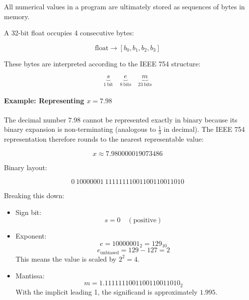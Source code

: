 \documentclass[11pt]{article}
\begin{document}
All numerical values in a program are ultimately stored as sequences of bytes in memory.

A 32-bit float occupies 4 consecutive bytes:

\begin{equation}
    \text{float} \rightarrow [b_0, b_1, b_2, b_3]
\end{equation}

These bytes are interpreted according to the IEEE 754 structure:

\begin{equation}
    \underbrace{s}_{1\ \text{bit}} \quad
    \underbrace{e}_{8\ \text{bits}} \quad
    \underbrace{m}_{23\ \text{bits}}
\end{equation}

\paragraph{Example: Representing $x = 7.98$}

The decimal number $7.98$ cannot be represented exactly in binary because its binary expansion is non-terminating (analogous to $\frac{1}{3}$ in decimal). The IEEE 754 representation therefore rounds to the nearest representable value:

\begin{equation}
    x \approx 7.980000019073486
\end{equation}

Binary layout:

\begin{equation}
    0\ 10000001\ 11111111001100110011010
\end{equation}

Breaking this down:

\begin{itemize}
    \item Sign bit:
    \begin{equation}
        s = 0 \quad (\text{positive})
    \end{equation}

    \item Exponent:
    \begin{equation}
        e = 10000001_2 = 129_{10}
    \end{equation}
    \begin{equation}
        e_{\text{unbiased}} = 129 - 127 = 2
    \end{equation}
    This means the value is scaled by $2^2 = 4$.

    \item Mantissa:
    \begin{equation}
        m = 1.1111111001100110011010_2
    \end{equation}
    With the implicit leading 1, the significand is approximately $1.995$.
\end{itemize}
\end{document}
